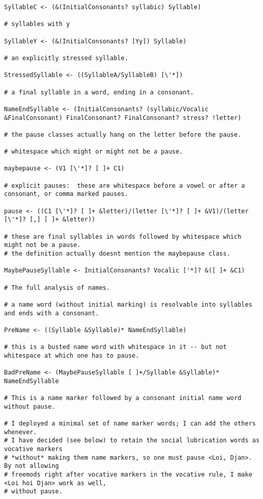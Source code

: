 \documentclass{article}
\begin{document}
\begin{verbatim}
SyllableC <- (&(InitialConsonants? syllabic) Syllable)

# syllables with y

SyllableY <- (&(InitialConsonants? [Yy]) Syllable)

# an explicitly stressed syllable.

StressedSyllable <- ((SyllableA/SyllableB) [\'*])

# a final syllable in a word, ending in a consonant.

NameEndSyllable <- (InitialConsonants? (syllabic/Vocalic &FinalConsonant) FinalConsonant? FinalConsonant? stress? !letter)

# the pause classes actually hang on the letter before the pause.

# whitespace which might or might not be a pause.

maybepause <- (V1 [\'*]? [ ]+ C1)

# explicit pauses:  these are whitespace before a vowel or after a consonant, or comma marked pauses.

pause <- ((C1 [\'*]? [ ]+ &letter)/(letter [\'*]? [ ]+ &V1)/(letter [\'*]? [,] [ ]+ &letter))

# these are final syllables in words followed by whitespace which might not be a pause.
# the definition actually doesnt mention the maybepause class.

MaybePauseSyllable <- InitialConsonants? Vocalic ['*]? &([ ]+ &C1)

# The full analysis of names.

# a name word (without initial marking) is resolvable into syllables and ends with a consonant.

PreName <- ((Syllable &Syllable)* NameEndSyllable)

# this is a busted name word with whitespace in it -- but not whitespace at which one has to pause.

BadPreName <- (MaybePauseSyllable [ ]+/Syllable &Syllable)* NameEndSyllable

# This is a name marker followed by a consonant initial name word without pause.

# I deployed a minimal set of name marker words; I can add the others whenever.
# I have decided (see below) to retain the social lubrication words as vocative markers
# *without* making them name markers, so one must pause <Loi, Djan>.  By not allowing
# freemods right after vocative markers in the vocative rule, I make <Loi hoi Djan> work as well,
# without pause.


\end{verbatim}
\end{document}
